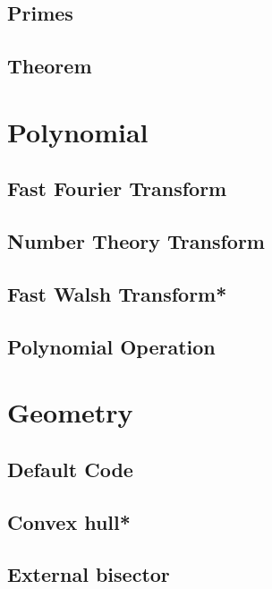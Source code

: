 \subsection{Primes}

\subsection{Theorem}


\section{Polynomial}
\subsection{Fast Fourier Transform}

\subsection{Number Theory Transform}

\subsection{Fast Walsh Transform*} %

\subsection{Polynomial Operation}



\section{Geometry}
\subsection{Default Code}

\subsection{Convex hull*} %

\subsection{External bisector}

